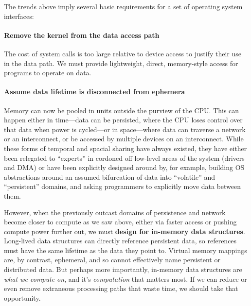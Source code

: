\begin{chconc}

    The trends above imply several basic requirements for a set of operating system interfaces:

    \paragraph{Remove the kernel from the data access path} The cost of system calls is too large relative to device
    access to justify their use in the data path. We must provide lightweight, direct, memory-style access for
    programs to operate on data.

    \paragraph{Assume data lifetime is disconnected from ephemera} Memory can now be pooled in units outside the
    purview of the CPU. This can happen either in time---data can be persisted, where the CPU loses control over that
    data when power is cycled---or in space---where data can traverse a network or an interconnect, or be accessed by
    multiple devices on an interconnect. While these forms of temporal and spacial sharing have always existed, they
    have either been relegated to ``experts'' in cordoned off low-level areas of the system (drivers and DMA) or have
    been explicitly designed around by, for example, building OS abstractions around an assumed bifurcation of data into
    ``volatile'' and ``persistent'' domains, and asking programmers to explicitly move data between
    them.

    However, when the previously outcast
    domains of persistence and network become closer to compute as we saw above, either via faster access or pushing compute power
    further out, we must \textbf{design for in-memory data structures}. Long-lived data structures can directly reference
    persistent data, so references must have the same lifetime as the data they point to. Virtual memory mappings are, by
    contrast, ephemeral, and so cannot effectively name persistent or distributed data. But perhaps more importantly,
    in-memory data structures are \emph{what we compute on}, and it's \emph{computation} that matters most. If we can reduce
    or even remove extraneous processing paths that waste time, we should take that opportunity.



\end{chconc}
